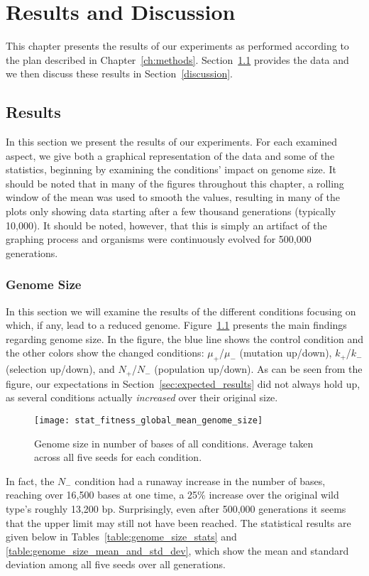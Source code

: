 \chapter{Results and Discussion}\label{ch:results_discussion}
This chapter presents the results of our experiments as performed according to the plan described in Chapter~\ref{ch:methods}. Section~\ref{results} provides the data and we then discuss these results in Section~\ref{discussion}. 

\section{Results}\label{results}
In this section we present the results of our experiments. For each examined aspect, we give both a graphical representation of the data and some of the statistics, beginning by examining the conditions' impact on genome size. It should be noted that in many of the figures throughout this chapter, a rolling window of the mean was used to smooth the values, resulting in many of the plots only showing data starting after a few thousand generations (typically 10,000). It should be noted, however, that this is simply an artifact of the graphing process and organisms were continuously evolved for 500,000 generations. 

\subsection{Genome Size}\label{sec:genome_size}
In this section we will examine the results of the different conditions focusing on which, if any, lead to a reduced genome. Figure~\ref{fig:genome_size} presents the main findings regarding genome size. In the figure, the blue line shows the control condition and the other colors show the changed conditions: $\mu_+$/$\mu_-$ (mutation up/down), $k_+$/$k_-$ (selection up/down), and $N_+$/$N_-$ (population up/down). As can be seen from the figure, our expectations in Section~\ref{sec:expected_results} did not always hold up, as several conditions actually \textit{increased} over their original size. 
\begin{figure}[H]
	\texttt{[image: stat\_fitness\_global\_mean\_genome\_size]}
	\centering
	\caption[Genome size]{Genome size in number of bases of all conditions. Average taken across all five seeds for each condition.}
	\label{fig:genome_size}
\end{figure}
In fact, the $N_-$ condition had a runaway increase in the number of bases, reaching over 16,500 bases at one time, a 25\% increase over the original wild type's roughly 13,200 bp. Surprisingly, even after 500,000 generations it seems that the upper limit may still not have been reached. The statistical results are given below in Tables~\ref{table:genome_size_stats} and \ref{table:genome_size_mean_and_std_dev}, which show the mean and standard deviation among all five seeds over all generations.

